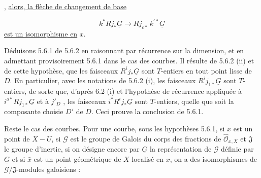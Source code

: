 \begin{center}
\end{center}
,
\underline{alors, la flèche de changement de base}

\begin{equation*}
k^* Rj_*\underline{G} \longrightarrow Rj_{c*}\, k^{\prime *}\underline{G}
\end{equation*}
\underline{est un isomorphisme en} $x$.

Déduisons 5.6.1 de 5.6.2 en raisonnant par récurrence sur la dimension, et en admettant provisoirement 5.6.1 dans le cas des courbes. Il résulte de 5.6.2 (ii) et de cette hypothèse, que les faisceaux $R^i j_*\underline{G}$ sont $T$-entiers en tout point lisse de $D$. En particulier, avec les notations de 5.6.2 (i), les faisceaux $R^i j_{1*}\underline{G}$ sont $T$-entiers, de sorte que, d'après 6.2 (i) et l'hypothèse de récurrence appliquée à $i^{o*} Rj_{1*}\underline{G}$ et à $j'_D$ , les faisceaux $i^* R^i j_*\underline{G}$ sont $T$-entiers, quelle que soit la composante choisie $D'$ de $D$. Ceci prouve la conclusion de 5.6.1.

Reste le cas des courbes. Pour une courbe, sous les hypothèses 5.6.1, si $x$ est un point de $X - U$, si $\mathcal{G}$ est le groupe de Galois du corps des fractions de $\hat{\mathcal{O}}_{x,X}$ et $\mathfrak{J}$ le groupe d'inertie, si on désigne encore par $\underline{G}$ la représentation de $\mathcal{G}$ définie par $\underline{G}$ et si $\bar{x}$ est un point géométrique de $X$ localisé en $x$, on a des isomorphismes de $\mathcal{G}/\mathfrak{J}$-modules galoisiens :

